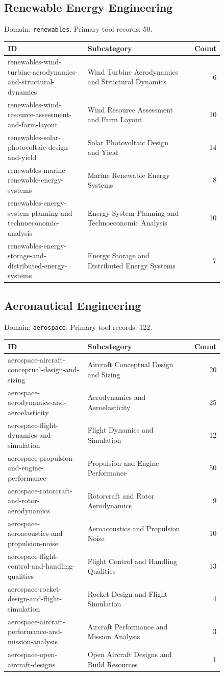 \subsection{Renewable Energy Engineering}
\noindent Domain: \texttt{renewables}. Primary tool records: 50.
\begin{longtable}{p{0.37\linewidth}p{0.47\linewidth}r}
ID & Subcategory & Count\\\hline\endhead
renewables-wind-turbine-aerodynamics-and-structural-dynamics & Wind Turbine Aerodynamics and Structural Dynamics & 6\\
renewables-wind-resource-assessment-and-farm-layout & Wind Resource Assessment and Farm Layout & 10\\
renewables-solar-photovoltaic-design-and-yield & Solar Photovoltaic Design and Yield & 14\\
renewables-marine-renewable-energy-systems & Marine Renewable Energy Systems & 8\\
renewables-energy-system-planning-and-technoeconomic-analysis & Energy System Planning and Technoeconomic Analysis & 10\\
renewables-energy-storage-and-distributed-energy-systems & Energy Storage and Distributed Energy Systems & 7\\
\end{longtable}
\subsection{Aeronautical Engineering}
\noindent Domain: \texttt{aerospace}. Primary tool records: 122.
\begin{longtable}{p{0.37\linewidth}p{0.47\linewidth}r}
ID & Subcategory & Count\\\hline\endhead
aerospace-aircraft-conceptual-design-and-sizing & Aircraft Conceptual Design and Sizing & 20\\
aerospace-aerodynamics-and-aeroelasticity & Aerodynamics and Aeroelasticity & 25\\
aerospace-flight-dynamics-and-simulation & Flight Dynamics and Simulation & 12\\
aerospace-propulsion-and-engine-performance & Propulsion and Engine Performance & 50\\
aerospace-rotorcraft-and-rotor-aerodynamics & Rotorcraft and Rotor Aerodynamics & 9\\
aerospace-aeroacoustics-and-propulsion-noise & Aeroacoustics and Propulsion Noise & 10\\
aerospace-flight-control-and-handling-qualities & Flight Control and Handling Qualities & 13\\
aerospace-rocket-design-and-flight-simulation & Rocket Design and Flight Simulation & 4\\
aerospace-aircraft-performance-and-mission-analysis & Aircraft Performance and Mission Analysis & 3\\
aerospace-open-aircraft-designs & Open Aircraft Designs and Build Resources & 1\\
\end{longtable}
